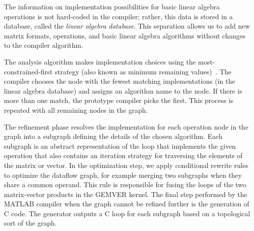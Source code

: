 \documentclass[runningheads]{llncs}
\begin{document}
The information on implementation possibilities for basic linear algebra
operations is not hard-coded in the compiler; rather, this data is stored
in a database, called the \emph{linear algebra database}.  This separation
allows us to add new matrix formats, operations, and basic linear algebra
algorithms without changes to the compiler algorithm.

The analysis algorithm makes implementation choices using the
most-con\-strained-first strategy (also known as minimum remaining
values)~\cite{Russell:2003mz}.  The compiler chooses the node with the fewest
matching implementations (in the linear algebra database) and assigns an
algorithm name to the node.  If there is more than one match, the prototype
compiler picks the first.  This process is repeated with all remaining nodes
in the graph.

The refinement phase resolves the implementation for each operation node in
the graph into a subgraph defining the details of the chosen algorithm.  Each
subgraph is an abstract representation of the loop that implements the given
operation that also contains an iteration strategy for traversing the
elements of the matrix or vector.
In the optimization step, we apply conditional rewrite rules to optimize the
dataflow graph, for example merging two subgraphs when they share a common
operand. This rule is responsible for fusing the loops of the two
matrix-vector products in the GEMVER kernel.  
The final step performed by the MATLAB compiler when the graph cannot be
refined further is the generation of C code. The generator outputs a C loop
for each subgraph based on a topological sort of the graph. 

%
\end{document}
